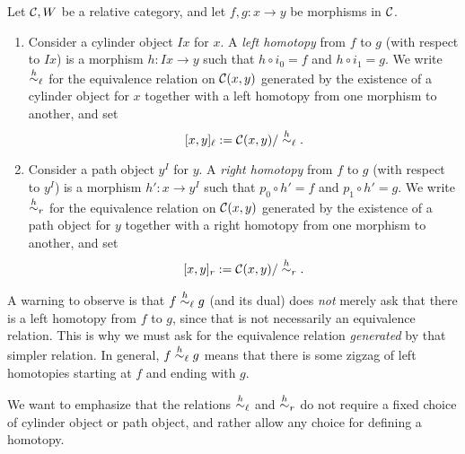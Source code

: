 \begin{definition}
	Let \(\mathcal{C},W\) be a relative category, and let \(f,g\!:x\to y\) be morphisms in \(\mathcal{C}\).
	\begin{enumerate}[label=(\roman*)]
		\item Consider a cylinder object \(Ix\) for \(x\). A \emph{left homotopy} from \(f\) to \(g\) (with respect to \(Ix\)) is a morphism \(h\!:Ix \to y\)
		such that \(h\circ i_0 = f\) and \(h\circ i_1 = g\). We write \(\overset{h}{\sim}_\ell\) for the equivalence relation on \(\mathcal{C}(x,y)\) generated by the existence of
		a cylinder object for \(x\) together with a left homotopy from one morphism to another, and set
		\[ [x,y]_\ell := \mathcal{C}(x,y)/\overset{h}{\sim}_\ell. \]
		\item Consider a path object \(y^I\) for \(y\). A \emph{right homotopy} from \(f\) to \(g\) (with respect to \(y^I\)) is a morphism \(h'\!:x\to y^I\)
		such that \(p_0\circ h' = f\) and \(p_1\circ h' = g\). We write \(\overset{h}{\sim}_r\) for the equivalence relation on \(\mathcal{C}(x,y)\) generated by the existence of
		a path object for \(y\) together with a right homotopy from one morphism to another, and set
		\[ [x,y]_r := \mathcal{C}(x,y)/\overset{h}{\sim}_r. \]
	\end{enumerate}
\end{definition}

\begin{remark}
	A warning to observe is that \(f \overset{h}{\sim}_\ell g\) (and its dual) does \emph{not} merely ask that there is a left homotopy from \(f\) to \(g\), since that is not
	necessarily an equivalence relation. This is why we must ask for the equivalence relation \emph{generated} by that simpler relation. In general, \(f\overset{h}{\sim}_\ell g\)
	means that there is some zigzag of left homotopies starting at \(f\) and ending with \(g\).
\end{remark}
\begin{remark}
	We want to emphasize that the relations \(\overset{h}{\sim}_\ell\) and \(\overset{h}{\sim}_r\) do not require a fixed choice of cylinder object or path object, and rather allow any
	choice for defining a homotopy.
\end{remark}

